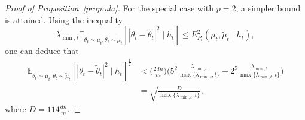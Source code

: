 \documentclass[11pt]{article}
\theoremstyle{plain}
\theoremstyle{definition}
\theoremstyle{remark}
\begin{document}
\begin{proof}[Proof of Proposition~\ref{prop:ula}]
For the special case with $p=2$, a simpler bound is attained. 
Using the inequality 
\[
\lambda_{\min,t}\mathbb{E}_{\theta_t\sim\mu_{t},\tilde\theta_t\sim\tilde \mu_{t}}{[|\theta_t-\tilde{\theta}_t|^2 \mid h_{t}]} \leq  E^2_{P_t}(\mu_{t},\tilde \mu_{t}\mid h_{t}),
\]
one can deduce that
\begin{align*}
\mathbb{E}_{\theta_t\sim\mu_{t},\tilde\theta_t\sim\tilde \mu_{t}}{[|\theta_t-\tilde{\theta}_t|^2 \mid h_{t}]}^{\frac{1}{2}} &<
\bigg(\frac{2dn}{m}\bigg)\bigg(5^{2}\frac{\lambda_{\min,t}}{\max\{\lambda_{\min,t},t\}}+2^{5}\frac{\lambda_{\min,t}}{\max\{\lambda_{\min,t},t\}}\bigg)\\
&= 
 \sqrt{\frac{{D}}{{\max\{\lambda_{\min,t},t\}}}},
\end{align*}
where $ D = 114\frac{dn}{m}$.
\end{proof}
\end{document}
